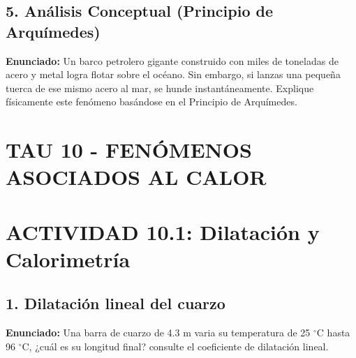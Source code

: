 \documentclass[12pt, letterpaper]{article}
\begin{document}
	\subsection*{5. Análisis Conceptual (Principio de Arquímedes)}
	\noindent \textbf{Enunciado:} Un barco petrolero gigante construido con miles de toneladas de acero y metal logra flotar sobre el océano. Sin embargo, si lanzas una pequeña tuerca de ese mismo acero al mar, se hunde instantáneamente. Explique físicamente este fenómeno basándose en el Principio de Arquímedes.
	
	
	\section*{TAU 10 - FENÓMENOS ASOCIADOS AL CALOR}
	
	\section*{ACTIVIDAD 10.1: Dilatación y Calorimetría}
	
	\subsection*{1. Dilatación lineal del cuarzo}
	\noindent \textbf{Enunciado:} Una barra de cuarzo de 4.3 m varia su temperatura de 25 $^{\circ}$C hasta 96 $^{\circ}$C, ¿cuál es su longitud final? consulte el coeficiente de dilatación lineal.
	
\end{document}

